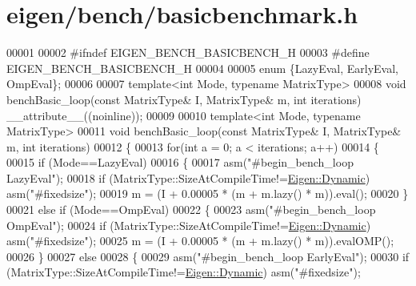 \hypertarget{eigen_2bench_2basicbenchmark_8h_source}{}\section{eigen/bench/basicbenchmark.h}
\label{eigen_2bench_2basicbenchmark_8h_source}

\begin{DoxyCode}
00001 
00002 \textcolor{preprocessor}{#ifndef EIGEN\_BENCH\_BASICBENCH\_H}
00003 \textcolor{preprocessor}{#define EIGEN\_BENCH\_BASICBENCH\_H}
00004 
00005 \textcolor{keyword}{enum} \{LazyEval, EarlyEval, OmpEval\};
00006 
00007 \textcolor{keyword}{template}<\textcolor{keywordtype}{int} Mode, \textcolor{keyword}{typename} MatrixType>
00008 \textcolor{keywordtype}{void} benchBasic\_loop(\textcolor{keyword}{const} MatrixType& I, MatrixType& m, \textcolor{keywordtype}{int} iterations) \_\_attribute\_\_((noinline));
00009 
00010 \textcolor{keyword}{template}<\textcolor{keywordtype}{int} Mode, \textcolor{keyword}{typename} MatrixType>
00011 \textcolor{keywordtype}{void} benchBasic\_loop(\textcolor{keyword}{const} MatrixType& I, MatrixType& m, \textcolor{keywordtype}{int} iterations)
00012 \{
00013   \textcolor{keywordflow}{for}(\textcolor{keywordtype}{int} a = 0; a < iterations; a++)
00014   \{
00015     \textcolor{keywordflow}{if} (Mode==LazyEval)
00016     \{
00017       \textcolor{keyword}{asm}(\textcolor{stringliteral}{"#begin\_bench\_loop LazyEval"});
00018       \textcolor{keywordflow}{if} (MatrixType::SizeAtCompileTime!=\hyperlink{namespace_eigen_ad81fa7195215a0ce30017dfac309f0b2}{Eigen::Dynamic}) \textcolor{keyword}{asm}(\textcolor{stringliteral}{"#fixedsize"});
00019       m = (I + 0.00005 * (m + m.lazy() * m)).eval();
00020     \}
00021     \textcolor{keywordflow}{else} \textcolor{keywordflow}{if} (Mode==OmpEval)
00022     \{
00023       \textcolor{keyword}{asm}(\textcolor{stringliteral}{"#begin\_bench\_loop OmpEval"});
00024       \textcolor{keywordflow}{if} (MatrixType::SizeAtCompileTime!=\hyperlink{namespace_eigen_ad81fa7195215a0ce30017dfac309f0b2}{Eigen::Dynamic}) \textcolor{keyword}{asm}(\textcolor{stringliteral}{"#fixedsize"});
00025       m = (I + 0.00005 * (m + m.lazy() * m)).evalOMP();
00026     \}
00027     \textcolor{keywordflow}{else}
00028     \{
00029       \textcolor{keyword}{asm}(\textcolor{stringliteral}{"#begin\_bench\_loop EarlyEval"});
00030       \textcolor{keywordflow}{if} (MatrixType::SizeAtCompileTime!=\hyperlink{namespace_eigen_ad81fa7195215a0ce30017dfac309f0b2}{Eigen::Dynamic}) \textcolor{keyword}{asm}(\textcolor{stringliteral}{"#fixedsize"});

\end{DoxyCode}
